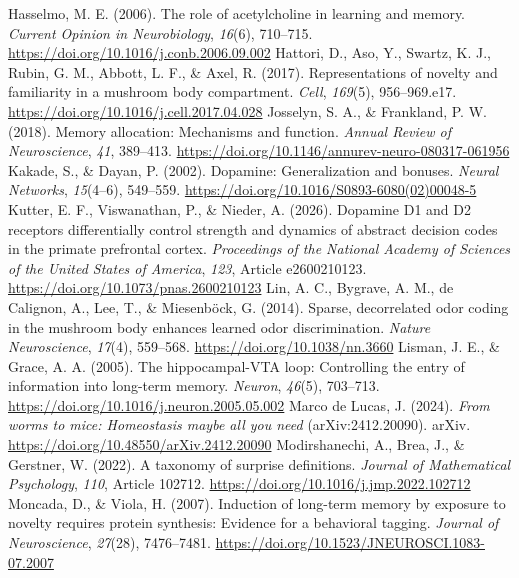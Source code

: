 \documentclass[11pt,a4paper]{article}
\begin{document}
\begin{thebibliography}{}
 Hasselmo, M. E. (2006). The role of acetylcholine in learning and memory. \emph{Current Opinion in Neurobiology}, \emph{16}(6), 710--715. \url{https://doi.org/10.1016/j.conb.2006.09.002}
 Hattori, D., Aso, Y., Swartz, K. J., Rubin, G. M., Abbott, L. F., \& Axel, R. (2017). Representations of novelty and familiarity in a mushroom body compartment. \emph{Cell}, \emph{169}(5), 956--969.e17. \url{https://doi.org/10.1016/j.cell.2017.04.028}
 Josselyn, S. A., \& Frankland, P. W. (2018). Memory allocation: Mechanisms and function. \emph{Annual Review of Neuroscience}, \emph{41}, 389--413. \url{https://doi.org/10.1146/annurev-neuro-080317-061956}
 Kakade, S., \& Dayan, P. (2002). Dopamine: Generalization and bonuses. \emph{Neural Networks}, \emph{15}(4--6), 549--559. \url{https://doi.org/10.1016/S0893-6080(02)00048-5}
 Kutter, E. F., Viswanathan, P., \& Nieder, A. (2026). Dopamine D1 and D2 receptors differentially control strength and dynamics of abstract decision codes in the primate prefrontal cortex. \emph{Proceedings of the National Academy of Sciences of the United States of America}, \emph{123}, Article e2600210123. \url{https://doi.org/10.1073/pnas.2600210123}
 Lin, A. C., Bygrave, A. M., de Calignon, A., Lee, T., \& Miesenb\"ock, G. (2014). Sparse, decorrelated odor coding in the mushroom body enhances learned odor discrimination. \emph{Nature Neuroscience}, \emph{17}(4), 559--568. \url{https://doi.org/10.1038/nn.3660}
 Lisman, J. E., \& Grace, A. A. (2005). The hippocampal-VTA loop: Controlling the entry of information into long-term memory. \emph{Neuron}, \emph{46}(5), 703--713. \url{https://doi.org/10.1016/j.neuron.2005.05.002}
 Marco de Lucas, J. (2024). \emph{From worms to mice: Homeostasis maybe all you need} (arXiv:2412.20090). arXiv. \url{https://doi.org/10.48550/arXiv.2412.20090}
 Modirshanechi, A., Brea, J., \& Gerstner, W. (2022). A taxonomy of surprise definitions. \emph{Journal of Mathematical Psychology}, \emph{110}, Article 102712. \url{https://doi.org/10.1016/j.jmp.2022.102712}
 Moncada, D., \& Viola, H. (2007). Induction of long-term memory by exposure to novelty requires protein synthesis: Evidence for a behavioral tagging. \emph{Journal of Neuroscience}, \emph{27}(28), 7476--7481. \url{https://doi.org/10.1523/JNEUROSCI.1083-07.2007}

\end{thebibliography}
\end{document}
